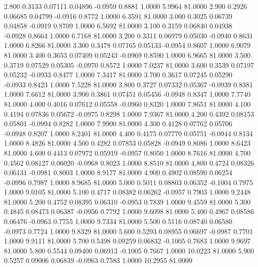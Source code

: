    2.800   0.3133   0.07111   0.04896  -0.0959   0.8881   1.0000   5.9964  81.0000
   2.900   0.2926   0.06685   0.04799  -0.0916   0.8772   1.0000   6.3591  81.0000
   3.000   0.3025   0.06739   0.04858  -0.0919   0.8709   1.0000   6.5692  81.0000
   3.100   0.3159   0.06840   0.04938  -0.0928   0.8664   1.0000   6.7168  81.0000
   3.200   0.3311   0.06979   0.05030  -0.0940   0.8631   1.0000   6.8266  81.0000
   3.300   0.3478   0.07165   0.05133  -0.0954   0.8607   1.0000   6.9079  81.0000
   3.400   0.3653   0.07409   0.05243  -0.0969   0.8590   1.0000   6.9665  81.0000
   3.500   0.3719   0.07529   0.05305  -0.0970   0.8572   1.0000   7.0237  81.0000
   3.600   0.3539   0.07197   0.05232  -0.0933   0.8477   1.0000   7.3417  81.0000
   3.700   0.3617   0.07245   0.05290  -0.0933   0.8423   1.0000   7.5228  81.0000
   3.800   0.3727   0.07332   0.05367  -0.0939   0.8381   1.0000   7.6612  81.0000
   3.900   0.3861   0.07451   0.05456  -0.0948   0.8347   1.0000   7.7740  81.0000
   4.000   0.4016   0.07612   0.05558  -0.0960   0.8320   1.0000   7.8651  81.0000
   4.100   0.4194   0.07836   0.05672  -0.0975   0.8298   1.0000   7.9367  81.0000
   4.200   0.4392   0.08153   0.05801  -0.0994   0.8282   1.0000   7.9900  81.0000
   4.300   0.4128   0.07762   0.05706  -0.0948   0.8207   1.0000   8.2401  81.0000
   4.400   0.4175   0.07770   0.05751  -0.0944   0.8134   1.0000   8.4826  81.0000
   4.500   0.4282   0.07853   0.05828  -0.0949   0.8086   1.0000   8.6423  81.0000
   4.600   0.4413   0.07972   0.05919  -0.0957   0.8050   1.0000   8.7616  81.0000
   4.700   0.4562   0.08127   0.06020  -0.0968   0.8023   1.0000   8.8510  81.0000
   4.800   0.4724   0.08326   0.06131  -0.0981   0.8003   1.0000   8.9177  81.0000
   4.900   0.4902   0.08590   0.06254  -0.0996   0.7987   1.0000   8.9685  81.0000
   5.000   0.5011   0.08803   0.06352  -0.1004   0.7975   1.0000   9.0105  81.0000
   5.100   0.4717   0.08382   0.06262  -0.0957   0.7903   1.0000   9.2448  81.0000
   5.200   0.4752   0.08395   0.06310  -0.0953   0.7839   1.0000   9.4559  81.0000
   5.300   0.4845   0.08473   0.06387  -0.0956   0.7792   1.0000   9.6098  81.0000
   5.400   0.4967   0.08586   0.06476  -0.0963   0.7755   1.0000   9.7334  81.0000
   5.500   0.5116   0.08740   0.06580  -0.0973   0.7724   1.0000   9.8329  81.0000
   5.600   0.5293   0.08955   0.06697  -0.0987   0.7701   1.0000   9.9111  81.0000
   5.700   0.5498   0.09259   0.06832  -0.1005   0.7683   1.0000   9.9697  81.0000
   5.800   0.5544   0.09400   0.06913  -0.1005   0.7667   1.0000  10.0223  81.0000
   5.900   0.5257   0.09006   0.06839  -0.0963   0.7583   1.0000  10.2955  81.0000
